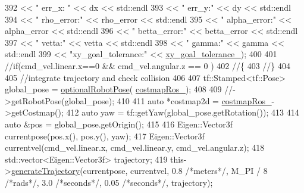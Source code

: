 \begin{DoxyCode}
{392                                               << \textcolor{stringliteral}{" err\_x: "} << dx << std::endl
393                                               << \textcolor{stringliteral}{" err\_y:"} << dy << std::endl
394                                               << \textcolor{stringliteral}{" rho\_error:"} << rho\_error << std::endl
395                                               << \textcolor{stringliteral}{" alpha\_error:"} << alpha\_error << std::endl
396                                               << \textcolor{stringliteral}{" betta\_error:"} << betta\_error << std::endl
397                                               << \textcolor{stringliteral}{" vetta:"} << vetta << std::endl
398                                               << \textcolor{stringliteral}{" gamma:"} << gamma << std::endl
399                                               << \textcolor{stringliteral}{"xy\_goal\_tolerance:"} << 
      \hyperlink{classcl__move__base__z_1_1forward__local__planner_1_1ForwardLocalPlanner_acd2ed91ee166f03faeeb9d6a4b91084b}{xy\_goal\_tolerance\_});
400 
401     \textcolor{comment}{//if(cmd\_vel.linear.x==0 && cmd\_vel.angular.z == 0 )}
402     \textcolor{comment}{//\{}
403     \textcolor{comment}{//\}}
404 
405     \textcolor{comment}{//integrate trajectory and check collision}
406 
407     tf::Stamped<tf::Pose> global\_pose = \hyperlink{namespacecl__move__base__z_1_1forward__local__planner_a4c20f9fe0ca67779c53e90182baf4997}{optionalRobotPose}(
      \hyperlink{classcl__move__base__z_1_1forward__local__planner_1_1ForwardLocalPlanner_a37791fea67ce92c6e38e3727311e533b}{costmapRos\_});
408     
409     \textcolor{comment}{//->getRobotPose(global\_pose);}
410 
411     \textcolor{keyword}{auto} *costmap2d = \hyperlink{classcl__move__base__z_1_1forward__local__planner_1_1ForwardLocalPlanner_a37791fea67ce92c6e38e3727311e533b}{costmapRos\_}->getCostmap();
412     \textcolor{keyword}{auto} yaw = tf::getYaw(global\_pose.getRotation());
413 
414     \textcolor{keyword}{auto} &pos = global\_pose.getOrigin();
415 
416     Eigen::Vector3f currentpose(pos.x(), pos.y(), yaw);
417     Eigen::Vector3f currentvel(cmd\_vel.linear.x, cmd\_vel.linear.y, cmd\_vel.angular.z);
418     std::vector<Eigen::Vector3f> trajectory;
419     this->\hyperlink{classcl__move__base__z_1_1forward__local__planner_1_1ForwardLocalPlanner_a3e852f81ccae82c56d7f25e56def899c}{generateTrajectory}(currentpose, currentvel, 0.8 \textcolor{comment}{/*meters*/}, M\_PI / 8 \textcolor{comment}{/*rads*/}, 
      3.0 \textcolor{comment}{/*seconds*/}, 0.05 \textcolor{comment}{/*seconds*/}, trajectory);
}
\end{DoxyCode}
